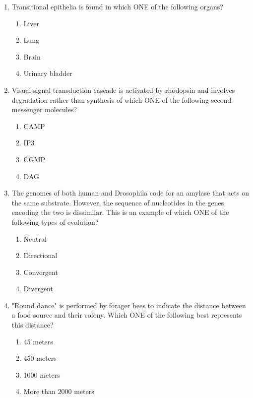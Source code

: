 \documentclass[journal,12pt,onecolumn]{IEEEtran}
\begin{document}
\begin{enumerate}[label=\arabic*.]
\item Transitional epithelia is found in which ONE of the following organs?

\begin{multicols}{4}
\begin{enumerate}[label=(\Alph*)]
\item Liver
\item Lung
\item Brain
\item Urinary bladder
\end{enumerate}
\end{multicols}

\item Visual signal transduction cascade is activated by rhodopsin and involves degradation rather than synthesis of which ONE of the following second messenger molecules?

\begin{multicols}{4}
\begin{enumerate}[label=(\Alph*)]
\item CAMP
\item IP3
\item CGMP
\item DAG
\end{enumerate}
\end{multicols}

\item The genomes of both human and Drosophila code for an amylase that acts on the same substrate. However, the sequence of nucleotides in the genes encoding the two is dissimilar. This is an example of which ONE of the following types of evolution?

\begin{multicols}{4}
\begin{enumerate}[label=(\Alph*)]
\item Neutral
\item Directional
\item Convergent
\item Divergent
\end{enumerate}
\end{multicols}

\item "Round dance" is performed by forager bees to indicate the distance between a food source and their colony. Which ONE of the following best represents this distance?

\begin{multicols}{2}
\begin{enumerate}[label=(\Alph*)]
\item 45 meters
\item 450 meters
\item 1000 meters
\item More than 2000 meters
\end{enumerate}
\end{multicols}


\end{enumerate}
\end{document}
